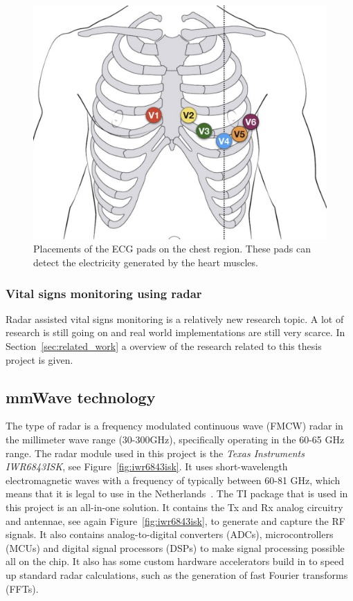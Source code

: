 \begin{figure}[t]
\centering
\includegraphics[width=.5\textwidth]{figures/background/ecg.png}
\caption{Placements of the ECG pads on the chest region. These pads can detect the electricity generated by the heart muscles.}
\label{fig:ecg}
\end{figure}

\subsubsection{Vital signs monitoring using radar}
Radar assisted vital signs monitoring is a relatively new research topic. A lot of research is still going on and real world implementations are still very scarce. In Section~\ref{sec:related_work} a overview of the research related to this thesis project is given.  

\subsection{mmWave technology}
\label{sec:mmwave_tech}
The type of radar is a frequency modulated continuous wave (FMCW) radar in the millimeter wave range (30-300GHz), specifically operating in the 60-65 GHz range. The radar module used in this project is the \emph{Texas Instruments IWR6843ISK}, see Figure~\ref{fig:iwr6843isk}. It uses short-wavelength electromagnetic waves with a frequency of typically between 60-81 GHz, which means that it is legal to use in the Netherlands~\cite{freq_plan}. The TI package that is used in this project is an all-in-one solution. It contains the Tx and Rx analog circuitry and antennae, see again Figure~\ref{fig:iwr6843isk}, to generate and capture the RF signals. It also contains analog-to-digital converters (ADCs), microcontrollers (MCUs) and digital signal processors (DSPs) to make signal processing possible all on the chip. It also has some custom hardware accelerators build in to speed up standard radar calculations, such as the generation of fast Fourier transforms (FFTs).

